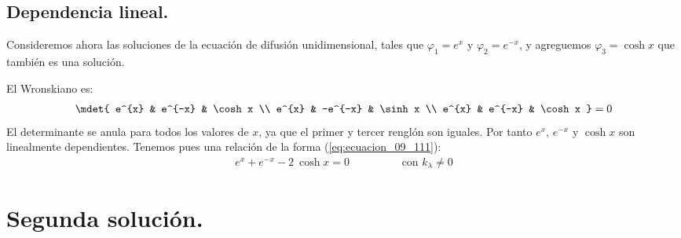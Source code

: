 \subsection{Dependencia lineal.}

Consideremos ahora las soluciones de la ecuación de difusión unidimensional, tales que $\varphi_{1} = e^{x}$ y $\varphi_{2} = e^{-x}$, y agreguemos $\varphi_{3} = \cosh x$ que también es una solución. 
\par
El Wronskiano es:
\begin{align*}
\mdet{
e^{x}  & e^{-x} & \cosh x \\
e^{x}  & -e^{-x} & \sinh x \\
e^{x}  & e^{-x} & \cosh x
} = 0
\end{align*}
El determinante se anula para todos los valores de $x$, ya que el primer y tercer renglón son iguales. Por tanto $e^{x}$, $e^{-x}$ y $\cosh x$ son linealmente dependientes. Tenemos pues una relación de la forma (\ref{eq:ecuacion_09_111}):
\begin{align*}
e^{x} + e^{-x} - 2 \: \cosh x = 0 \hspace{2cm} \text{con } k_{\lambda} \neq 0
\end{align*}

\section{Segunda solución.}

